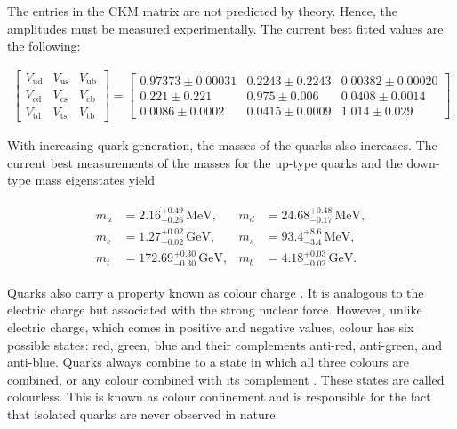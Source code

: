 \documentclass[bachelor,ngerman,english]{GAUBM}
\begin{document}
The entries in the CKM matrix are not predicted by theory. Hence, the amplitudes must be measured experimentally. The current best fitted values \cite{pdg} are the following:

\begin{align}
    \begin{bmatrix}
        V_\text{ud} & V_\text{us} & V_\text{ub}\\
        V_\text{cd} & V_\text{cs} & V_\text{cb}\\
        V_\text{td} & V_\text{ts} & V_\text{tb}
    \end{bmatrix} = 
    \begin{bmatrix}
        0.97373\pm0.00031   & 0.2243\pm0.2243   & 0.00382\pm0.00020\\
        0.221\pm0.221       & 0.975\pm0.006     & 0.0408\pm0.0014\\
        0.0086\pm0.0002     & 0.0415\pm0.0009   & 1.014\pm0.029
    \end{bmatrix}
    \label{eq:ckm_matrix}
\end{align}

With increasing quark generation, the masses of the quarks also increases. The current best measurements of the masses for the up-type quarks and the down-type mass eigenstates \cite{pdg} yield 

\begin{gather}
    \begin{aligned}
        m_u &= 2.16^{+0.49}_{-0.26}\,\text{MeV},    & m_d &= 24.68^{+0.48}_{-0.17}\,\text{MeV},\\
        m_c &= 1.27^{+0.02}_{-0.02}\,\text{GeV},    & m_s &= 93.4^{+8.6}_{-3.4}\,\text{MeV},\\
        m_t &= 172.69^{+0.30}_{-0.30}\,\text{GeV},  & m_b &= 4.18^{+0.03}_{-0.02}\,\text{GeV}.
        \label{eq:mass_quarks}
    \end{aligned}
\end{gather}

Quarks also carry a property known as colour charge \cite{theory:qcd_01,theory:qcd_02}. It is analogous to the electric charge but associated with the strong nuclear force. However, unlike electric charge, which comes in positive and negative values, colour has six possible states: red, green, blue and their complements anti-red, anti-green, and anti-blue. Quarks always combine to a state in which all three colours are combined, or any colour combined with its complement \cite{theory:qcd_02}. These states are called colourless. This is known as colour confinement and is responsible for the fact that isolated quarks are never observed in nature.
\end{document}
